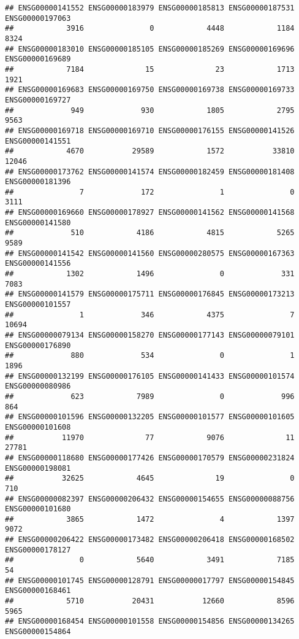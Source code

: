\documentclass[
]{article}
\begin{document}
\begin{verbatim}
## ENSG00000141552 ENSG00000183979 ENSG00000185813 ENSG00000187531 ENSG00000197063 
##            3916               0            4448            1184            8324 
## ENSG00000183010 ENSG00000185105 ENSG00000185269 ENSG00000169696 ENSG00000169689 
##            7184              15              23            1713            1921 
## ENSG00000169683 ENSG00000169750 ENSG00000169738 ENSG00000169733 ENSG00000169727 
##             949             930            1805            2795            9563 
## ENSG00000169718 ENSG00000169710 ENSG00000176155 ENSG00000141526 ENSG00000141551 
##            4670           29589            1572           33810           12046 
## ENSG00000173762 ENSG00000141574 ENSG00000182459 ENSG00000181408 ENSG00000181396 
##               7             172               1               0            3111 
## ENSG00000169660 ENSG00000178927 ENSG00000141562 ENSG00000141568 ENSG00000141580 
##             510            4186            4815            5265            9589 
## ENSG00000141542 ENSG00000141560 ENSG00000280575 ENSG00000167363 ENSG00000141556 
##            1302            1496               0             331            7083 
## ENSG00000141579 ENSG00000175711 ENSG00000176845 ENSG00000173213 ENSG00000101557 
##               1             346            4375               7           10694 
## ENSG00000079134 ENSG00000158270 ENSG00000177143 ENSG00000079101 ENSG00000176890 
##             880             534               0               1            1896 
## ENSG00000132199 ENSG00000176105 ENSG00000141433 ENSG00000101574 ENSG00000080986 
##             623            7989               0             996             864 
## ENSG00000101596 ENSG00000132205 ENSG00000101577 ENSG00000101605 ENSG00000101608 
##           11970              77            9076              11           27781 
## ENSG00000118680 ENSG00000177426 ENSG00000170579 ENSG00000231824 ENSG00000198081 
##           32625            4645              19               0             710 
## ENSG00000082397 ENSG00000206432 ENSG00000154655 ENSG00000088756 ENSG00000101680 
##            3865            1472               4            1397            9072 
## ENSG00000206422 ENSG00000173482 ENSG00000206418 ENSG00000168502 ENSG00000178127 
##               0            5640            3491            7185              54 
## ENSG00000101745 ENSG00000128791 ENSG00000017797 ENSG00000154845 ENSG00000168461 
##            5710           20431           12660            8596            5965 
## ENSG00000168454 ENSG00000101558 ENSG00000154856 ENSG00000134265 ENSG00000154864 

\end{verbatim}
\end{document}

